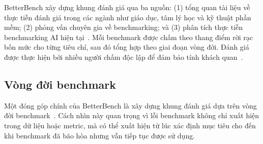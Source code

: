 BetterBench xây dựng khung đánh giá qua ba nguồn: (1) tổng quan tài liệu về thực tiễn đánh giá trong các ngành như giáo dục, tâm lý học và kỹ thuật phần mềm; (2) phỏng vấn chuyên gia về benchmarking; và (3) phân tích thực tiễn benchmarking AI hiện tại~\cite{betterbench}. Mỗi benchmark được chấm theo thang điểm rời rạc bốn mức cho từng tiêu chí, sau đó tổng hợp theo giai đoạn vòng đời. Đánh giá được thực hiện bởi nhiều người chấm độc lập để đảm bảo tính khách quan~\cite{betterbench}.

\subsection{Vòng đời benchmark}

Một đóng góp chính của BetterBench là xây dựng khung đánh giá dựa trên vòng đời benchmark~\cite{betterbench}. Cách nhìn này quan trọng vì lỗi benchmark không chỉ xuất hiện trong dữ liệu hoặc metric, mà có thể xuất hiện từ lúc xác định mục tiêu cho đến khi benchmark đã bão hòa nhưng vẫn tiếp tục được sử dụng.

